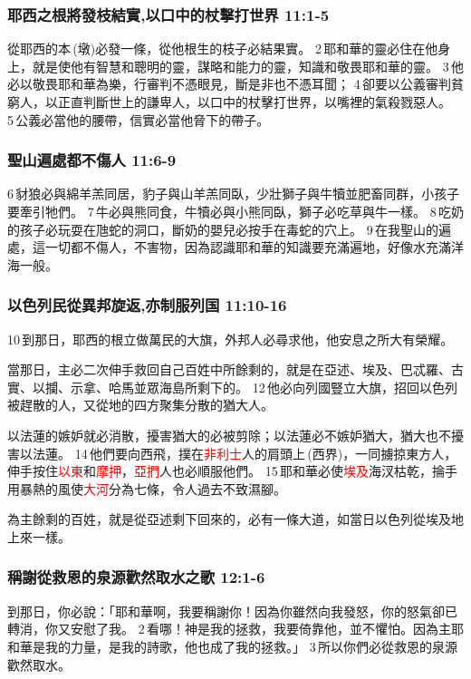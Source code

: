 \subsubsection{耶西之根將發枝結實,以口中的杖擊打世界 11:1-5}
從耶西的本 (墩)必發一條，從他根生的枝子必結果實。 2 耶和華的靈必住在他身上，就是使他有智慧和聰明的靈，謀略和能力的靈，知識和敬畏耶和華的靈。 3 他必以敬畏耶和華為樂，行審判不憑眼見，斷是非也不憑耳聞； 4 卻要以公義審判貧窮人，以正直判斷世上的謙卑人，以口中的杖擊打世界，以嘴裡的氣殺戮惡人。 5 公義必當他的腰帶，信實必當他脅下的帶子。

\subsubsection{聖山遍處都不傷人 11:6-9}
6 豺狼必與綿羊羔同居，豹子與山羊羔同臥，少壯獅子與牛犢並肥畜同群，小孩子要牽引牠們。 7 牛必與熊同食，牛犢必與小熊同臥，獅子必吃草與牛一樣。 8 吃奶的孩子必玩耍在虺蛇的洞口，斷奶的嬰兒必按手在毒蛇的穴上。 9 在我聖山的遍處，這一切都不傷人，不害物，因為認識耶和華的知識要充滿遍地，好像水充滿洋海一般。



\subsubsection{以色列民從異邦旋返,亦制服列国 11:10-16}
10 到那日，耶西的根立做萬民的大旗，外邦人必尋求他，他安息之所大有榮耀。

當那日，主必二次伸手救回自己百姓中所餘剩的，就是在亞述、埃及、巴忒羅、古實、以攔、示拿、哈馬並眾海島所剩下的。 12 他必向列國豎立大旗，招回以色列被趕散的人，又從地的四方聚集分散的猶大人。 

以法蓮的嫉妒就必消散，擾害猶大的必被剪除；以法蓮必不嫉妒猶大，猶大也不擾害以法蓮。 14 他們要向西飛，撲在\textcolor{red}{非利士}人的肩頭上 (西界)，一同擄掠東方人，伸手按住\textcolor{red}{以東}和\textcolor{red}{摩押}，\textcolor{red}{亞捫}人也必順服他們。 15 耶和華必使\textcolor{red}{埃及}海汊枯乾，掄手用暴熱的風使\textcolor{red}{大河}分為七條，令人過去不致濕腳。 

為主餘剩的百姓，就是從亞述剩下回來的，必有一條大道，如當日以色列從埃及地上來一樣。

\subsubsection{稱謝從救恩的泉源歡然取水之歌 12:1-6}
到那日，你必說：「耶和華啊，我要稱謝你！因為你雖然向我發怒，你的怒氣卻已轉消，你又安慰了我。 2 看哪！神是我的拯救，我要倚靠他，並不懼怕。因為主耶和華是我的力量，是我的詩歌，他也成了我的拯救。」 3 所以你們必從救恩的泉源歡然取水。 

